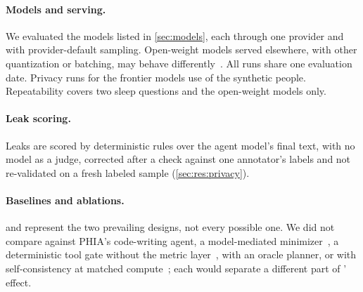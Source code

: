 \paragraph{Models and serving.} We evaluated the \nModels{} models listed in \cref{sec:models}, each through one
provider and with provider-default sampling. Open-weight models served elsewhere, with other quantization or
batching, may behave differently~\citep{yuan2025nondeterminism,he2025nondeterminism}. All runs share one evaluation
date. Privacy runs for the frontier models use \privPeopleOther{} of the \privPeopleOpen{} synthetic people. Repeatability covers two
sleep questions and the open-weight models only.

\paragraph{Leak scoring.} Leaks are scored by deterministic rules over the agent model's final text, with no model as
a judge, corrected after a check against one annotator's labels and not re-validated on a fresh labeled sample
(\cref{sec:res:privacy}).

\paragraph{Baselines and ablations.} \CA{} and \CB{} represent the two prevailing designs, not every possible one. We
did not compare against PHIA's code-writing agent, a model-mediated minimizer~\citep{bagdasarian2024airgap}, a
deterministic tool gate without the metric layer~\citep{shi2025progent}, \CC{} with an oracle planner, or \CA{} with
self-consistency at matched compute~\citep{wang2023selfconsistency}; each would separate a different part of
\sys{}' effect.
